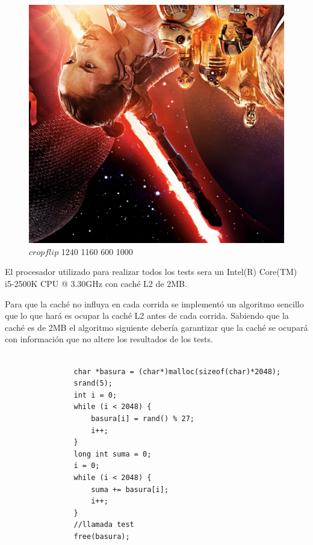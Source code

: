 \begin{figure}
  \begin{center}
	\includegraphics[scale=0.10]{imagenes/starWarscropflip.jpg}
	\caption{$cropflip$ 1240 1160 600 1000}
	\label{starwarscropflip}
  \end{center}
\end{figure}


El procesador utilizado para realizar todos los tests sera un Intel(R) Core(TM) i5-2500K CPU @ 3.30GHz con caché L2 de 2MB.

Para que la caché no influya en cada corrida se implementó un algoritmo sencillo que lo que hará es ocupar la caché L2 antes de cada corrida. Sabiendo que la caché es de 2MB el algoritmo siguiente debería garantizar que la caché se ocupará con información que no altere los resultados de los tests. \\

\begin{codesnippet}
\begin{verbatim}
                
                char *basura = (char*)malloc(sizeof(char)*2048);
                srand(5);
                int i = 0;
                while (i < 2048) {
                    basura[i] = rand() % 27;            
                    i++;                
                }
                long int suma = 0;
                i = 0;                
                while (i < 2048) {
                    suma += basura[i];   
                    i++;         
                }
                //llamada test
                free(basura);
                
\end{verbatim}
\end{codesnippet}

